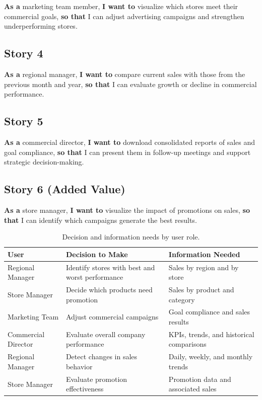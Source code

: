 \documentclass[12pt,a4paper]{article}
\begin{document}
\textbf{As a} marketing team member, \textbf{I want to} visualize which stores meet their commercial goals, \textbf{so that} I can adjust advertising campaigns and strengthen underperforming stores.

\subsection{Story 4}

\textbf{As a} regional manager, \textbf{I want to} compare current sales with those from the previous month and year, \textbf{so that} I can evaluate growth or decline in commercial performance.

\subsection{Story 5}

\textbf{As a} commercial director, \textbf{I want to} download consolidated reports of sales and goal compliance, \textbf{so that} I can present them in follow-up meetings and support strategic decision-making.

\subsection{Story 6 (Added Value)}

\textbf{As a} store manager, \textbf{I want to} visualize the impact of promotions on sales, \textbf{so that} I can identify which campaigns generate the best results.

\begin{table}[H]
\centering
\small
\begin{tabular}{p{3.5cm} p{5cm} p{5cm}}
\toprule
\textbf{User} & \textbf{Decision to Make} & \textbf{Information Needed}\\
\midrule
Regional Manager & Identify stores with best and worst performance & Sales by region and by store\\
Store Manager & Decide which products need promotion & Sales by product and category\\
Marketing Team & Adjust commercial campaigns & Goal compliance and sales results\\
Commercial Director & Evaluate overall company performance & KPIs, trends, and historical comparisons\\
Regional Manager & Detect changes in sales behavior & Daily, weekly, and monthly trends\\
Store Manager & Evaluate promotion effectiveness & Promotion data and associated sales\\
\bottomrule
\end{tabular}
\caption{Decision and information needs by user role.}
\end{table}
\end{document}
